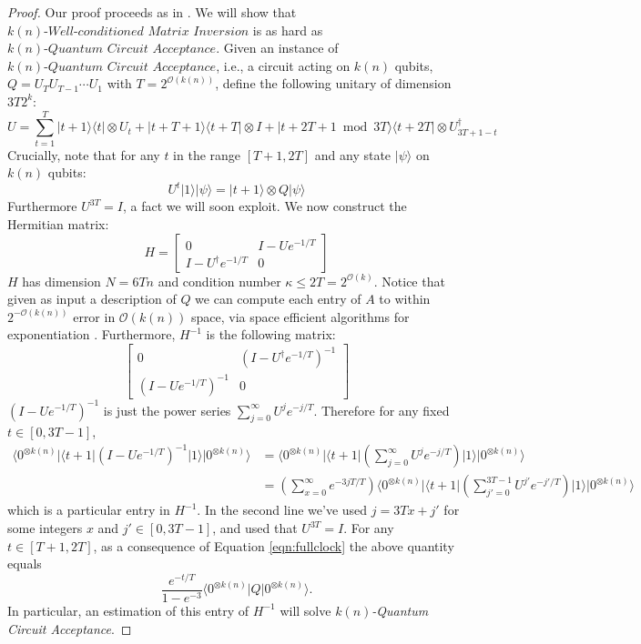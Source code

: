\documentclass[11pt]{article}
\theoremstyle{definition}
\theoremstyle{remark}
\newcommand\matrixinvert[1]{{\ensuremath{#1}}\textit{-Well-conditioned Matrix Inversion}}
\newcommand\qca[1]{\ensuremath{#1}\textit{-Quantum Circuit Acceptance}}
\newcommand{\zero}{\ensuremath{0^{\otimes{k(n)}}}}
\newcommand\bigoh{\mathcal{O}}
\begin{document}
\begin{proof}
Our proof proceeds as in \cite{HHL}.  We will show that $\matrixinvert{k(n)}$ is as hard as $\qca{k(n)}$.  Given an instance of $\qca{k(n)}$, i.e., a circuit acting on $k(n)$ qubits, $Q=U_TU_{T-1}\cdots U_1$ with $T = 2^{\mathcal{O}(k(n))}$, define the following unitary of dimension $3T2^k$:
\[U=\sum_{t=1}^{T}|t+1\rangle\langle t|\otimes U_t+|t+T+1\rangle\langle t+T|\otimes I+|t+2T+1\bmod{3T}\rangle\langle t+2T|\otimes U_{3T+1-t}^{\dagger}\]	
Crucially, note that for any $t$ in the range $[T+1,2T]$ and any state $|\psi\rangle$ on $k(n)$ qubits: 
\begin{equation}\label{eqn:fullclock}
	U^t|1\rangle|\psi\rangle=|t+1\rangle\otimes Q|\psi\rangle
\end{equation}
Furthermore $U^{3T}=I$, a fact we will soon exploit. We now construct the Hermitian matrix:
\begin{equation}
H=\begin{bmatrix}
    0 & I-Ue^{-1/T}\\
   I-U^{\dagger}e^{-1/T} &  0
\end{bmatrix}
\end{equation}
 $H$ has dimension $N=6Tn$ and condition number $\kappa\leq 2T=2^{\bigoh (k)}$.  Notice that given as input a description of $Q$ we can compute each entry of $A$ to within $2^{-\mathcal{O}(k(n))}$ error in $\mathcal{O}(k(n))$ space, via space efficient algorithms for exponentiation \cite{reif}.
   Furthermore, $H^{-1}$ is the following matrix:
\begin{equation}
\begin{bmatrix}
    0 & \left(I-U^\dagger e^{-1/T}\right)^{-1}\\
   \left(I-Ue^{-1/T}\right)^{-1} &  0
\end{bmatrix}
\end{equation}
$\left(I-Ue^{-1/T}\right)^{-1}$ is just the power series $\sum_{j=0}^\infty U^j e^{-j/T}$. Therefore for any fixed $t \in [0,3T-1]$,
 \begin{align}
\langle\zero|\langle t+1|\left(I-Ue^{-1/T}\right)^{-1}|1\rangle|\zero\rangle
&=\langle\zero|\langle t+1|\left(\sum_{j=0}^\infty U^j e^{-j/T}\right)|1\rangle|\zero\rangle \\
&= \left( \sum_{x=0}^\infty e^{-3jT/T} \right) \langle\zero|\langle t+1|\left(\sum_{j'=0}^{3T-1} U^{j'} e^{-j'/T}\right)|1\rangle|\zero\rangle
\end{align}
which is a particular entry in $H^{-1}$. In the second line we've used $j = 3Tx + j'$ for some integers $x$ and $j' \in [0,3T-1]$, and used that $U^{3T}=I$.  For any $t \in [T+1,2T]$, as a consequence of Equation \ref{eqn:fullclock} the above quantity equals
\begin{equation}
\frac{e^{-t/T}}{1-e^{-3}}\langle\zero|Q|\zero\rangle.
\end{equation}
In particular, an estimation of this entry of $H^{-1}$ will solve \qca{k(n)}.
\end{proof}
\end{document}
